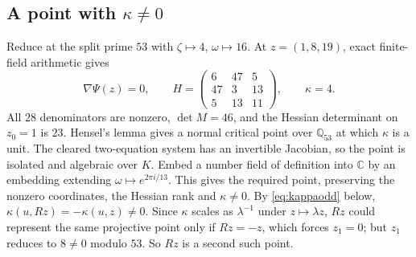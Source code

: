 \documentclass[11pt]{article}
\theoremstyle{remark}\newtheorem{remark}[theorem]{Remark}
\newcommand{\C}{\mathbb C}\newcommand{\Q}{\mathbb Q}
\begin{document}
\subsection{A point with \texorpdfstring{$\kappa\ne0$}{nonzero kappa}}
Reduce at the split prime $53$ with $\zeta\mapsto4$, $\omega\mapsto16$.
At $z=(1,8,19)$, exact finite-field arithmetic gives
\[
 \nabla\Psi(z)=0,\qquad
 H=\begin{pmatrix}6&47&5\\47&3&13\\5&13&11\end{pmatrix},\qquad\kappa=4.
\]
All $28$ denominators are nonzero, $\det M=46$, and the Hessian determinant
on $z_0=1$ is $23$. Hensel's lemma gives a normal critical point over
$\Q_{53}$ at which $\kappa$ is a unit. The cleared two-equation system has
an invertible Jacobian, so the point is isolated and algebraic over $K$.
Embed a number field of definition into $\C$ by an embedding extending
$\omega\mapsto e^{2\pi i/13}$. This gives the required point, preserving the
nonzero coordinates, the Hessian rank and $\kappa\ne0$. By \eqref{eq:kappaodd} below, $\kappa(u,Rz)=-\kappa(u,z)\ne0$. Since $\kappa$ scales as $\lambda^{-1}$ under $z\mapsto\lambda z$, $Rz$ could represent the same projective point only if $Rz=-z$, which forces $z_1=0$; but $z_1$ reduces to $8\ne0$ modulo $53$. So $Rz$ is a second such point.
\end{document}
